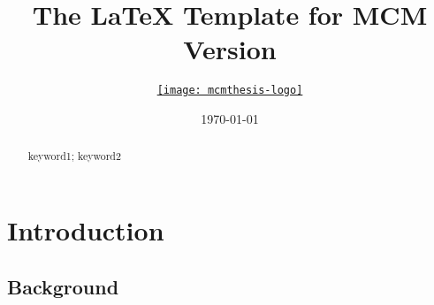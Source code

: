 \documentclass{mcmthesis}
\title{The \LaTeX{} Template for MCM Version \MCMversion}
\author{\small \href{http://www.latexstudio.net/}
  {\texttt{[image: mcmthesis-logo]}}}
\date{\today}
\begin{document}
\begin{abstract}
\lipsum[1]
\begin{keywords}
keyword1; keyword2
\end{keywords}
\end{abstract}
\maketitle
\tableofcontents
\newpage
\section{Introduction}




\subsection{Background}
\end{document}
